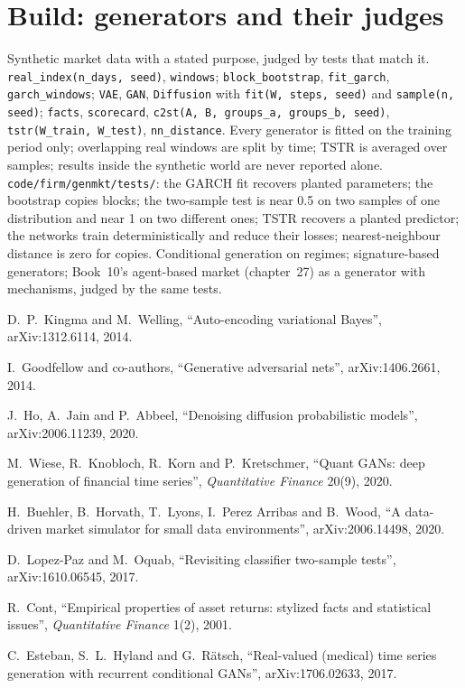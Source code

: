\section{Build: generators and their judges}\label{bld:ml:generative-models-and-synthetic-data:genmkt}

\begin{build}
 Synthetic market data with a stated purpose, judged by tests that match it.
 \texttt{real\_index(n\_days, seed)}, \texttt{windows}; \texttt{block\_bootstrap}, \texttt{fit\_garch},
\texttt{garch\_windows}; \texttt{VAE}, \texttt{GAN}, \texttt{Diffusion} with \texttt{fit(W, steps, seed)} and
\texttt{sample(n, seed)}; \texttt{facts}, \texttt{scorecard}, \texttt{c2st(A, B, groups\_a, groups\_b, seed)},
\texttt{tstr(W\_train, W\_test)}, \texttt{nn\_distance}.
 Every generator is fitted on the training period only; overlapping real windows are split by time; TSTR is
averaged over samples; results inside the synthetic world are never reported alone.
 \texttt{code/firm/genmkt/tests/}: the GARCH fit recovers planted parameters; the bootstrap copies
blocks; the two-sample test is near 0.5 on two samples of one distribution and near 1 on two different ones; TSTR recovers a
planted predictor; the networks train deterministically and reduce their losses; nearest-neighbour distance is zero for
copies.
 Conditional generation on regimes; signature-based generators; Book~10's agent-based market (chapter~27)
as a generator with mechanisms, judged by the same tests.
\end{build}

\begin{omsources}
\item D.~P.~Kingma and M.~Welling, ``Auto-encoding variational Bayes'', arXiv:1312.6114, 2014.
\item I.~Goodfellow and co-authors, ``Generative adversarial nets'', arXiv:1406.2661, 2014.
\item J.~Ho, A.~Jain and P.~Abbeel, ``Denoising diffusion probabilistic models'', arXiv:2006.11239, 2020.
\item M.~Wiese, R.~Knobloch, R.~Korn and P.~Kretschmer, ``Quant GANs: deep generation of financial time series'',
\emph{Quantitative Finance} 20(9), 2020.
\item H.~Buehler, B.~Horvath, T.~Lyons, I.~Perez Arribas and B.~Wood, ``A data-driven market simulator for small data
environments'', arXiv:2006.14498, 2020.
\item D.~Lopez-Paz and M.~Oquab, ``Revisiting classifier two-sample tests'', arXiv:1610.06545, 2017.
\item R.~Cont, ``Empirical properties of asset returns: stylized facts and statistical issues'', \emph{Quantitative Finance}
1(2), 2001.
\item C.~Esteban, S.~L.~Hyland and G.~Rätsch, ``Real-valued (medical) time series generation with recurrent conditional
GANs'', arXiv:1706.02633, 2017.
\end{omsources}

